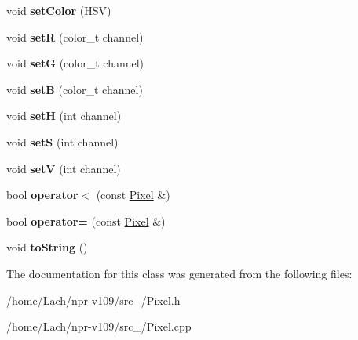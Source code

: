 \begin{DoxyCompactItemize}
void {\bfseries set\+Color} (\hyperlink{structHSV}{H\+SV})
\item 
\hypertarget{classPixel_a7669a7187a0d2a009de71c77871b58de}{}\label{classPixel_a7669a7187a0d2a009de71c77871b58de} 
void {\bfseries setR} (color\+\_\+t channel)
\item 
\hypertarget{classPixel_a3d4e74403f26074ba90a426d993088a9}{}\label{classPixel_a3d4e74403f26074ba90a426d993088a9} 
void {\bfseries setG} (color\+\_\+t channel)
\item 
\hypertarget{classPixel_ae1af48d6d61212522a678e3dc4daa22e}{}\label{classPixel_ae1af48d6d61212522a678e3dc4daa22e} 
void {\bfseries setB} (color\+\_\+t channel)
\item 
\hypertarget{classPixel_a9235a7497036c9066feeb8d019791bdc}{}\label{classPixel_a9235a7497036c9066feeb8d019791bdc} 
void {\bfseries setH} (int channel)
\item 
\hypertarget{classPixel_a0414e865cfc3a1e451f7a80cd7f165b8}{}\label{classPixel_a0414e865cfc3a1e451f7a80cd7f165b8} 
void {\bfseries setS} (int channel)
\item 
\hypertarget{classPixel_aa86fd55d3fd189062f94f3e557d3b988}{}\label{classPixel_aa86fd55d3fd189062f94f3e557d3b988} 
void {\bfseries setV} (int channel)
\item 
\hypertarget{classPixel_af81a1dc95e90fe9bf836c0e3b27cdbba}{}\label{classPixel_af81a1dc95e90fe9bf836c0e3b27cdbba} 
bool {\bfseries operator$<$} (const \hyperlink{classPixel}{Pixel} \&)
\item 
\hypertarget{classPixel_a0b56df19ddd3e7b7c53107047ff9083b}{}\label{classPixel_a0b56df19ddd3e7b7c53107047ff9083b} 
bool {\bfseries operator=} (const \hyperlink{classPixel}{Pixel} \&)
\item 
\hypertarget{classPixel_abded9446d55db7ec7eff0beb52d5c5a4}{}\label{classPixel_abded9446d55db7ec7eff0beb52d5c5a4} 
void {\bfseries to\+String} ()
\end{DoxyCompactItemize}


The documentation for this class was generated from the following files\+:\begin{DoxyCompactItemize}
\item 
/home/\+Lach/npr-\/v109/src\+\_/Pixel.\+h\item 
/home/\+Lach/npr-\/v109/src\+\_/Pixel.\+cpp\end{DoxyCompactItemize}
